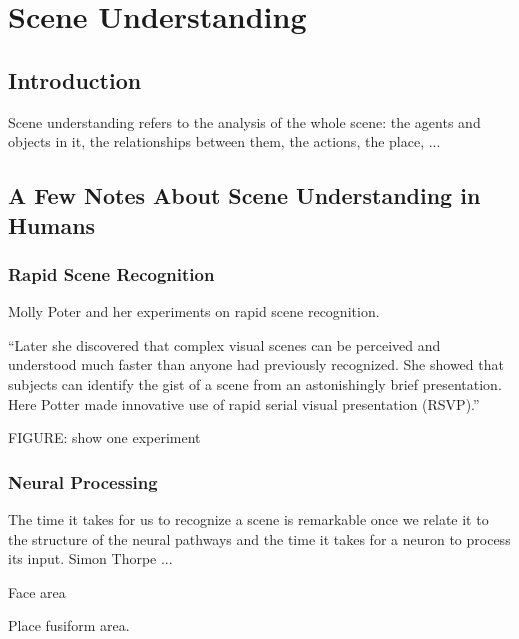 \chapter{Scene Understanding}
\label{chapter:scene_understanding}

\section{Introduction}




Scene understanding refers to the analysis of the whole scene: the agents and objects in it, the relationships between them, the actions, the place, ...


\section{A Few Notes About Scene Understanding in Humans}

\subsection{Rapid Scene Recognition}

Molly Poter and her experiments on rapid scene recognition.

``Later she discovered that complex visual scenes can be perceived and understood much faster than anyone had previously recognized. She showed that subjects can identify the gist of a scene from an astonishingly brief presentation. Here Potter made innovative use of rapid serial visual presentation (RSVP).''

FIGURE: show one experiment

\subsection{Neural Processing}

The time it takes for us to recognize a scene is remarkable once we relate it to the structure of the neural pathways and the time it takes for a neuron to process its input. Simon Thorpe ...

Face area

Place fusiform area.

